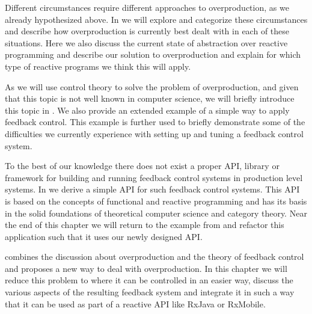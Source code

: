 Different circumstances require different approaches to overproduction, as we already hypothesized above. In  we will explore and categorize these circumstances and describe how overproduction is currently best dealt with in each of these situations. Here we also discuss the current state of abstraction over reactive programming and describe our solution to overproduction and explain for which type of reactive programs we think this will apply.

As we will use control theory to solve the problem of overproduction, and given that this topic is not well known in computer science, we will briefly introduce this topic in . We also provide an extended example of a simple way to apply feedback control. This example is further used to briefly demonstrate some of the difficulties we currently experience with setting up and tuning a feedback control system.

To the best of our knowledge there does not exist a proper API, library or framework for building and running feedback control systems in production level systems. In  we derive a simple API for such feedback control systems. This API is based on the concepts of functional and reactive programming and has its basis in the solid foundations of theoretical computer science and category theory. Near the end of this chapter we will return to the example from  and refactor this application such that it uses our newly designed API.

 combines the discussion about overproduction and the theory of feedback control and proposes a new way to deal with overproduction. In this chapter we will reduce this problem to where it can be controlled in an easier way, discuss the various aspects of the resulting feedback system and integrate it in such a way that it can be used as part of a reactive API like RxJava or RxMobile.
